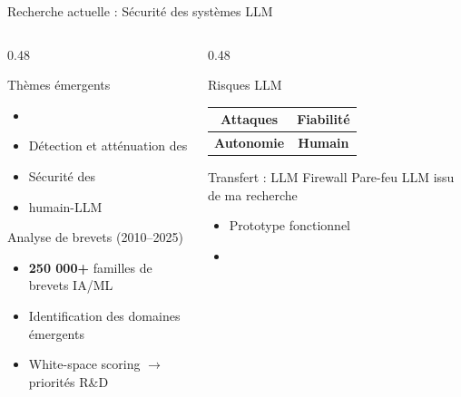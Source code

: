 \documentclass[aspectratio=169,11pt]{beamer}
\begin{document}
\begin{frame}{Recherche actuelle : Sécurité des systèmes LLM}
  \begin{columns}[T]
    \begin{column}{0.48\textwidth}
      \begin{block}{Thèmes émergents}
        \begin{itemize}
          \item {}
          \item Détection et atténuation des 
          \item Sécurité des 
          \item {} humain-LLM
        \end{itemize}
      \end{block}
      
      \begin{block}{Analyse de brevets (2010--2025)}
        \begin{itemize}
          \item \textbf{250 000+} familles de brevets IA/ML
          \item Identification des domaines émergents
          \item White-space scoring $\rightarrow$ priorités R\&D
        \end{itemize}
      \end{block}
    \end{column}
    \begin{column}{0.48\textwidth}
      \begin{alertblock}{Risques LLM}
        \centering
        \begin{tabular}{c|c}
          \textcolor{red!70}{\textbf{Attaques}} & \textcolor{red!70}{\textbf{Fiabilité}} \\
          \hline
          \textcolor{red!70}{\textbf{Autonomie}} & \textcolor{red!70}{\textbf{Humain}} \\
        \end{tabular}
      \end{alertblock}
      
      \vspace{0.3em}
      
      \begin{exampleblock}{Transfert : LLM Firewall}
        {\small Pare-feu LLM issu de ma recherche}
        \begin{itemize}\small
          \item Prototype fonctionnel
          \item {}
        \end{itemize}
      \end{exampleblock}
    \end{column}
  \end{columns}
\end{frame}
\end{document}
